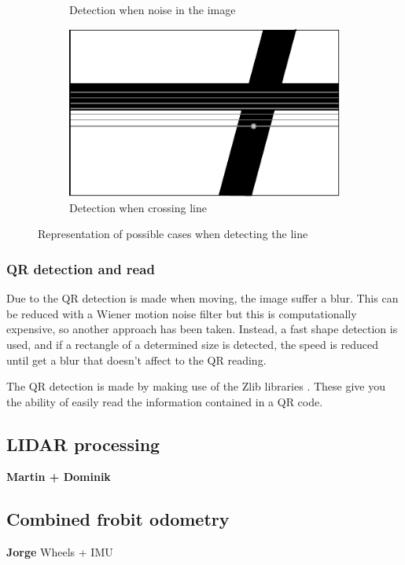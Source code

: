 \begin{figure}
\begin{subfigure}[ht!]{0.296\textwidth}
	            \caption{Detection when noise in the image}
	            \label{fig:mr_camera_processing_2}
	    	\end{subfigure}
	    	\begin{subfigure}[ht!]{0.296\textwidth}
	            \includegraphics[width=\textwidth]{figs/mr_camera_processing_3}
	            \caption{Detection when crossing line}
	            \label{fig:mr_camera_processing_3}
	    	\end{subfigure}
	    \caption{Representation of possible cases when detecting the line}
	    \end{figure}

	\subsubsection{QR detection and read} %
	\label{ssub:qr_detection_and_read}
	Due to the QR detection is made when moving, the image suffer a blur.
	This can be reduced with a Wiener motion noise filter but this is computationally expensive, so another approach has been taken.
	Instead, a fast shape detection is used, and if a rectangle of a determined size is detected, the speed is reduced until get a blur that doesn't affect to the QR reading.

	The QR detection is made by making use of the Zlib libraries \cite{zlib}. 
	These give you the ability of easily read the information contained in a QR code.



	\subsection{LIDAR processing} %
	\label{sub:mr_lidar_processing}
	\textbf{Martin + Dominik}


	\subsection{Combined frobit odometry} %
	\label{sub:mr_combined_frobit_odometry}
	\textbf{Jorge}
	Wheels + IMU
	

